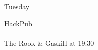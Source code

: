 \documentclass[14pt, landscape]{article}
\begin{document}
\begin{minipage}[t][17cm][t]{\textwidth}
\begin{multicols}{2}

\begin{minipage}{0.5\textwidth}
{\fontsize{30}{40}\selectfont Tuesday}\\
\vspace{0.2cm}
\begin{addmargin}[1em]{0em}
{\fontsize{24}{34}\selectfont \textcolor{emphasistext}{HackPub}}\\
\vspace{0.1cm}\\
{\fontsize{20}{30}\selectfont The Rook \& Gaskill at 19:30}
\end{addmargin}
\end{minipage}
\vspace{0.5cm}\\

\end{multicols}
\end{minipage}

\noindent\hdashrule[0cm]{39.5cm}{1pt}{2pt}
\end{document}
